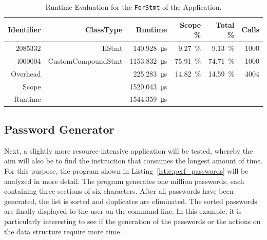 \begin{table}
  \centering
    \caption{Runtime Evaluation for the \lstinline{ForStmt} of the \FIBONACCI Application.}
  \begin{tabular}{rrrrrr}
    \toprule
    Identifier & ClassType          & Runtime                      & Scope \%             & Total \%             & Calls \\
    \midrule
    2085332    & IfStmt             & \SI{140.928}{\micro\second}  & \SI{9.27}{\percent}  & \SI{9.13}{\percent}  & 1000  \\
    i000004    & CustomCompoundStmt & \SI{1153.832}{\micro\second} & \SI{75.91}{\percent} & \SI{74.71}{\percent} & 1000  \\
    Overhead   &                    & \SI{225.283}{\micro\second}  & \SI{14.82}{\percent} & \SI{14.59}{\percent} & 4004  \\
    \midrule
    Scope      &                    & \SI{1520.043}{\micro\second} &                      &                              \\
    Runtime    &                    & \SI{1544.359}{\micro\second} &                      &                              \\
    \bottomrule
  \end{tabular}
  \label{tab:e:fibonaccioutput2}
\end{table}

\subsection{Password Generator}
\label{sectionPasswordCode}
Next, a slightly more resource-intensive application will be tested, whereby the aim will also be to find the instruction that consumes the longest amount of time. For this purpose, the \PASSWORDGEN program shown in Listing~\ref{lst:e:perf_passwords} will be analyzed in more detail. The program generates one million passwords, each containing three sections of six characters. After all passwords have been generated, the list is sorted and duplicates are eliminated. The sorted passwords are finally displayed to the user on the command line. In this example, it is particularly interesting to see if the generation of the passwords or the actions on the data structure require more time.

